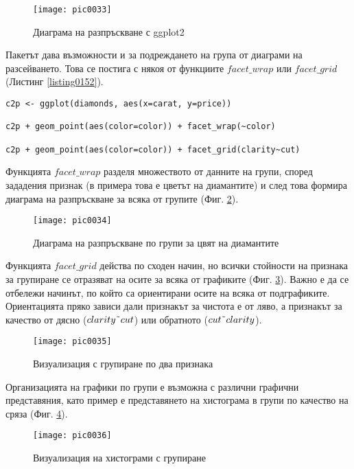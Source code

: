 \begin{figure}[h!]
  \centering
  \texttt{[image: pic0033]}
  \caption{Диаграма на разпръскване с ggplot2}
\label{figure0033}
\end{figure}
\FloatBarrier

Пакетът дава възможности и за подреждането на група от диаграми на разсейването. Това се постига с някоя от функциите $facet\_wrap$ или $facet\_grid$ (Листинг \ref{listing0152}). 

\begin{lstlisting}[caption=Диаграма на разпръскване групирани по признак, label=listing0152]
c2p <- ggplot(diamonds, aes(x=carat, y=price))

c2p + geom_point(aes(color=color)) + facet_wrap(~color)

c2p + geom_point(aes(color=color)) + facet_grid(clarity~cut)
\end{lstlisting}

Функцията $facet\_wrap$ разделя множеството от данните на групи, според зададения признак (в примера това е цветът на диамантите) и след това формира диаграма на разпръскване за всяка от групите (Фиг. \ref{figure0034}).

\begin{figure}[h!]
  \centering
  \texttt{[image: pic0034]}
  \caption{Диаграма на разпръскване по групи за цвят на диамантите}
\label{figure0034}
\end{figure}
\FloatBarrier

Функцията $facet\_grid$ действа по сходен начин, но всички стойности на признака за групиране се отразяват на осите за всяка от графиките (Фиг. \ref{figure0035}). Важно е да се отбележи начинът, по който са ориентирани осите на всяка от подграфиките. Ориентацията пряко зависи дали признакът за чистота е от ляво, а признакът за качество от дясно ($clarity\char`\~cut$) или обратното ($cut\char`\~clarity$).

\begin{figure}[h!]
  \centering
  \texttt{[image: pic0035]}
  \caption{Визуализация с групиране по два признака}
\label{figure0035}
\end{figure}
\FloatBarrier

Организацията на графики по групи е възможна с различни графични представяния, като пример е представянето на хистограма в групи по качество на сряза (Фиг. \ref{figure0036}).

\begin{figure}[h!]
  \centering
  \texttt{[image: pic0036]}
  \caption{Визуализация на хистограми с групиране}
\label{figure0036}
\end{figure}
\FloatBarrier

